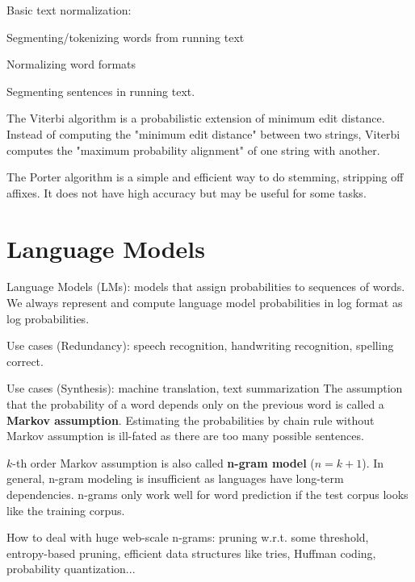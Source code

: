 \documentclass[12pt]{article}
\begin{document}
\ule
Basic text normalization:
\ulb
\item Segmenting/tokenizing words from running text
\item Normalizing word formats
\item Segmenting sentences in running text.
\ule
\par The Viterbi algorithm is a probabilistic extension of minimum edit distance. Instead of computing the "minimum edit distance" between two strings, Viterbi computes the "maximum probability alignment" of one string with another.
\par The Porter algorithm is a simple and efficient way to do stemming, stripping off affixes. It does not have high accuracy but may be useful for some tasks.

\section{Language Models}
\par Language Models (LMs): models that assign probabilities to sequences of words. We always represent and compute language model probabilities in log format as log probabilities.
\ulb
\item Use cases (Redundancy): speech recognition, handwriting recognition, spelling correct.
\item Use cases (Synthesis): machine translation, text summarization
\ule
The assumption that the probability of a word depends only on the previous word is called a \textbf{Markov assumption}. Estimating the probabilities by chain rule without Markov assumption is ill-fated as there are too many possible sentences.
\par $k$-th order Markov assumption is also called \textbf{n-gram model} ($n = k+1$). In general, n-gram modeling is insufficient as languages have long-term dependencies. n-grams only work well for word prediction if the test corpus looks like the training corpus.
\par How to deal with huge web-scale n-grams: pruning w.r.t. some threshold, entropy-based pruning, efficient data structures like tries, Huffman coding, probability quantization...
\end{document}
